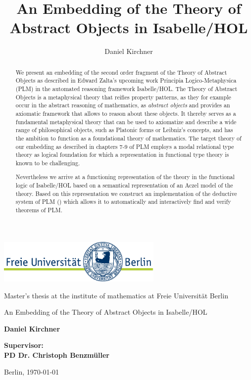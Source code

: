 \documentclass[a4paper,enabledeprecatedfontcommands]{scrreprt}
\title{An Embedding of the Theory of Abstract Objects in Isabelle/HOL}
\author{Daniel Kirchner}
\numberwithin{remark}{chapter}
\numberwithin{TODO}{chapter}
\begin{document}
\begin{titlepage}
\vspace{1cm}

\begin{center}
    \includegraphics[width=0.6\textwidth]{logo}
    \vspace{1cm}


Master's thesis at the institute of mathematics at Freie Universit\"at Berlin

    \vspace{2cm}


    \Large{\textsf{An Embedding of the Theory of Abstract Objects in Isabelle/HOL}}

    \vspace{2cm}

    \large{\textbf{Daniel Kirchner}}

    \vspace{2cm}

    \large{\textbf{
        Supervisor:\\
PD Dr. Christoph Benzm\"uller
    }}

    \vspace{2cm}
    \large{Berlin, \today}
\end{center}
\end{titlepage}
\begin{abstract}
	We present an embedding of the second order fragment of the Theory of Abstract Objects as described in Edward Zalta's
  upcoming work Principia Logico-Metaphysica (PLM\cite{PLM}) in the automated reasoning framework Isabelle/HOL. The Theory of Abstract
  Objects is a metaphysical theory that reifies property patterns, as they for example occur in the abstract reasoning
  of mathematics, as \emph{abstract objects} and provides an axiomatic framework that allows to reason about these objects.
  It thereby serves as a fundamental metaphysical theory that can be used to axiomatize and describe a wide range of philosophical
  objects, such as Platonic forms or Leibniz's concepts, and has the ambition to function as a foundational theory of mathematics.
  The target theory of our embedding as described in chapters 7-9 of PLM\cite{PLM} employs a modal relational type theory as
  logical foundation for which a representation in functional type theory is known to be challenging\cite{rtt}.
  
  Nevertheless we arrive at a functioning representation of the theory in the functional logic of Isabelle/HOL based on a semantical
  representation of an Aczel model of the theory. Based on this representation we construct an implementation of the deductive
  system of PLM (\cite[Chap. 9]{PLM}) which allows it to automatically and interactively find and verify theorems of PLM.
\end{abstract}
\tableofcontents
\end{document}
